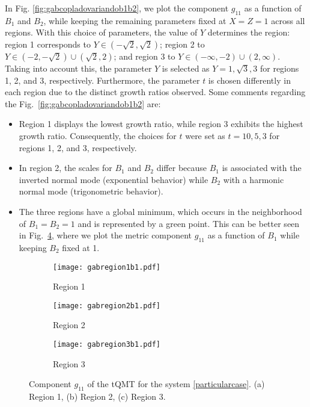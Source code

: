\documentclass[12pt]{iopart}
\begin{document}
In Fig. \ref{fig:gabcopladovariandob1b2}, we plot the component $g_{11}$ as a function of $B_1$ and $B_2$, while keeping the remaining parameters fixed at $X=Z=1$ across all regions.  With this choice of parameters, the value of $Y$ determines the region: region 1 corresponds to $Y\in(-\sqrt{2},\sqrt{2})$; region 2 to $Y\in(-2,-\sqrt{2})\cup (\sqrt{2},2)$; and region 3 to $Y\in(-\infty,-2)\cup(2,\infty)$. Taking into account this, the parameter $Y$ is selected as $Y=1,\sqrt{3},3$ for regions 1, 2, and 3, respectively. Furthermore, the parameter $t$ is chosen differently in each region due to the distinct growth ratios observed. Some comments regarding the Fig.~\ref{fig:gabcopladovariandob1b2} are:
\begin{itemize}
\item Region 1 displays the lowest growth ratio, while region 3 exhibits the highest growth ratio. Consequently, the choices for $t$ were set as $t=10,5,3$ for regions 1, 2, and 3, respectively. 
\item  In region 2, the scales for $B_1$ and $B_2$ differ because $B_1$ is associated with the inverted normal mode (exponential behavior) while $B_2$ with a harmonic normal mode (trigonometric behavior).

\item The three regions have a global minimum, which occurs in the neighborhood of $B_1=B_2=1$ and is represented by a green point. This can be better seen in Fig.~\ref{fig:gabcopladovariandob1}, where we plot the metric component $g_{11}$ as a function of $B_1$ while keeping $B_2$ fixed at 1.
\end{itemize}


\begin{figure}[H]
  \centering
  \begin{subfigure}{0.32\linewidth}{\texttt{[image: gabregion1b1.pdf]}}
    \caption{Region 1}
    \label{fig:gabcopladovariandob2a}
  \end{subfigure}
  \begin{subfigure}{0.32\linewidth}\texttt{[image: gabregion2b1.pdf]}
    \caption{Region 2}
    \label{fig:gabcopladovariandob2b}  
  \end{subfigure}
   \begin{subfigure}{0.32\linewidth}\texttt{[image: gabregion3b1.pdf]}
    \caption{Region 3}
    \label{fig:gabcopladovariandob2c}  
  \end{subfigure}
  \captionsetup{font=small} 
  \caption{\justifying Component $g_{11}$ of the tQMT for the system \eqref{particularcase}. (a) Region 1, (b) Region 2, (c) Region 3.}    \label{fig:gabcopladovariandob1}
\end{figure}
\end{document}
